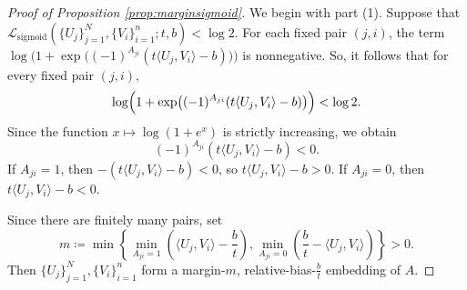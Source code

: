\documentclass[10pt,a4paper]{amsart}
\newcommand{\sigloss}{\mathcal{L}_{\text{sigmoid}}}
\begin{document}
\begin{proof}[Proof of Proposition \ref{prop:marginsigmoid}]

We begin with part (1). 
Suppose that $\sigloss(\{U_j\}_{j=1}^N,\{V_i\}_{i=1}^n;t,b)<\log 2$. For each fixed pair $(j,i)$, the term $\log\Big(1 + \exp\big((-1)^{A_{ji}}(t\langle U_j, V_i\rangle -b)\big)\Big)$ is nonnegative. So, it follows that for every fixed pair $(j,i),$
$$
\log\Bigl(1+\exp\bigl((-1)^{A_{ji}}(t\langle U_j,V_i\rangle-b)\bigr)\Bigr)<\log 2.
$$
Since the function $x\mapsto \log(1+e^x)$ is strictly increasing, we obtain
$$
(-1)^{A_{ji}}(t\langle U_j,V_i\rangle-b)<0.
$$
If $A_{ji}=1$, then $-(t\langle U_j,V_i\rangle-b)<0$, so $t\langle U_j,V_i\rangle-b>0.$ If $A_{ji}=0$, then $t\langle U_j,V_i\rangle-b<0.$

Since there are finitely many pairs, set
$$
m\coloneqq
\min\left\{
\min_{A_{ji}=1}\left(\langle U_j,V_i\rangle-\frac {b}{t}\right),
\min_{A_{ji}=0}\left(\frac {b}{t}-\langle U_j,V_i\rangle\right)
\right\}>0.
$$
Then $\{U_j\}_{j=1}^N,\{V_i\}_{i=1}^n$ form a margin-$m$, relative-bias-$\frac {b}{t}$ embedding of $A$.





\end{proof}
\end{document}
